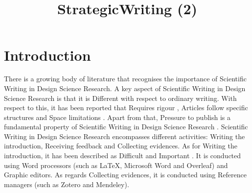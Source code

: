 \documentclass{article}
\title{StrategicWriting (2)}
\author{}
\begin{document}
\maketitle
      

\section{Introduction}

There is a growing body of literature that recognises the importance of Scientific Writing in Design Science Research. A key aspect of Scientific Writing in Design Science Research is that it is Different with respect to ordinary writing. With respect to this, it has been reported that Requires rigour \cite{JohannessonAnIntroduction}, Articles follow specific structures \cite{Turbek2016} \cite{JohannessonAnIntroduction} \cite{psychologicalscience.org} \cite{Kanoksilapatham2012} and Space limitations \cite{Gregor2013} \cite{Hsu2004}. Apart from that, Pressure to publish is a fundamental property of Scientific Writing in Design Science Research \cite{CoylarBecomingwriters} \cite{Turbek2016} \cite{Sorensen1994} \cite{Kanoksilapatham2012} \cite{Mizumoto2017} \cite{Cotterall2011}. Scientific Writing in Design Science Research encompasses different activities: Writing the introduction, Receiving feedback and Collecting evidences. As for Writing the introduction, it has been described as Difficult \cite{Hsu2004} \cite{Hsu2004} \cite{Hsu2004} \cite{PeatScientificWriting.} \cite{Cotterall2011} and Important \cite{Gregor2013} \cite{Turbek2016} \cite{Turbek2016} \cite{SwalesTheWriting} \cite{Khaw2017} \cite{Kanoksilapatham2012}. It is conducted using Word processors (such as LaTeX, Microsoft Word and Overleaf) and Graphic editors. As regards Collecting evidences, it is conducted using Reference managers (such as Zotero and Mendeley). 
    
\end{document}
